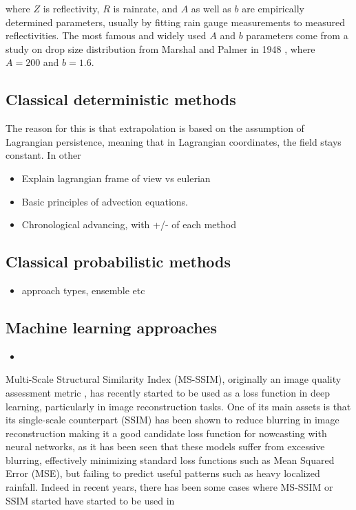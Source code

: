 where $Z$ is reflectivity, $R$ is rainrate, and $A$ as well as $b$ are empirically determined parameters, usually by fitting rain gauge measurements to measured reflectivities. The most famous and widely used $A$ and $b$ parameters come from a study on drop size distribution from Marshal and Palmer in 1948 \cite{marshall1948size}, where $A=200$ and $b=1.6$.






\subsection{Classical deterministic methods}
\label{section:classic_nowcast}

The reason for this is that extrapolation is based on the assumption of Lagrangian persistence, meaning that in Lagrangian coordinates, the field stays constant. In other 

\begin{itemize}
	\item Explain lagrangian frame of view vs eulerian
	\item Basic principles of advection equations. 
	\item Chronological advancing, with +/- of each method
\end{itemize}

\subsection{Classical probabilistic methods}
\begin{itemize}
	\item approach types, ensemble etc
\end{itemize}

\subsection{Machine learning approaches}
\begin{itemize}
	\item 
\end{itemize}

Multi-Scale Structural Similarity Index (MS-SSIM), originally an image quality assessment metric \cite{wang_multiscale_2003}, has recently started to be used as a loss function in deep learning, particularly in image reconstruction tasks. One of its main assets is that its single-scale counterpart (SSIM) has been shown to reduce blurring in image reconstruction \cite{zhao_loss_2017} making it a good candidate loss function for nowcasting with neural networks, as it has been seen that these models suffer from excessive blurring, effectively minimizing standard loss functions such as Mean Squared Error (MSE), but failing to predict useful patterns such as heavy localized rainfall. Indeed in recent years, there has been some cases where MS-SSIM or SSIM started have started to be used in 

